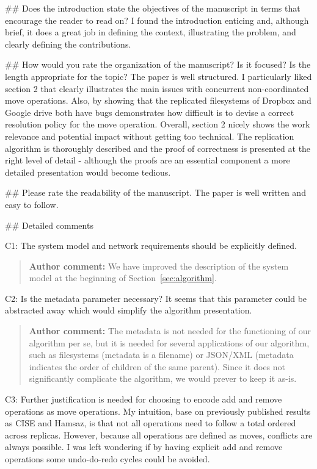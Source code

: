 \documentclass[10pt]{article}
\newcommand{\authorcomment}[1]{\begin{quote}\textbf{Author comment:} #1\end{quote}}
\begin{document}
\begin{spverbatim}
## Does the introduction state the objectives of the manuscript in terms that encourage the reader to read on?
I found the introduction enticing and, although brief, it does a great job in defining the context, illustrating the problem, and clearly defining the contributions.

## How would you rate the organization of the manuscript? Is it focused? Is the length appropriate for the topic?
The paper is well structured. I particularly liked section 2 that clearly illustrates the main issues with concurrent non-coordinated move operations. Also, by showing that the replicated filesystems of Dropbox and Google drive both have bugs demonstrates how difficult is to devise a correct resolution policy for the move operation. Overall, section 2 nicely shows the work relevance and potential impact without getting too technical.
The replication algorithm is thoroughly described and the proof of correctness is presented at the right level of detail - although the proofs are an essential component a more detailed presentation would become tedious.  

## Please rate the readability of the manuscript.
The paper is well written and easy to follow.

## Detailed comments

C1: The system model and network requirements should be explicitly defined.
\end{spverbatim}
\authorcomment{We have improved the description of the system model at the beginning of Section~\ref{sec:algorithm}.}
\begin{spverbatim}
C2: Is the metadata parameter necessary? It seems that this parameter could be abstracted away which would simplify the algorithm presentation.
\end{spverbatim}
\authorcomment{The metadata is not needed for the functioning of our algorithm per se, but it is needed for several applications of our algorithm, such as filesystems (metadata is a filename) or JSON/XML (metadata indicates the order of children of the same parent).
Since it does not significantly complicate the algorithm, we would prever to keep it as-is.}
\begin{spverbatim}
C3: Further justification is needed for choosing to encode add and remove operations as move operations. My intuition, base on previously published results as CISE and Hamsaz, is that not all operations need to follow a total ordered across replicas. However, because all operations are defined as moves, conflicts are always possible. I was left wondering if by having explicit add and remove operations some undo-do-redo cycles could be avoided.
\end{spverbatim}
\end{document}

